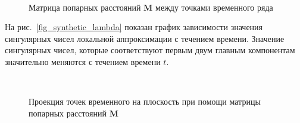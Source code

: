 \documentclass[12pt, twoside]{article}
\begin{document}
\begin{figure}[h!t]\center
{}
\\
\caption{Матрица попарных расстояний $\textbf{M}$ между точками временного ряда}
\label{fig_synthetic_distance}
\end{figure}

На рис.~\ref{fig_synthetic_lambda} показан график зависимости значения сингулярных чисел локальной аппроксимации с течением времени. Значение сингулярных чисел, которые соответствуют первым двум главным компонентам значительно меняются с течением времени $t$. 

\begin{figure}[h!t]\center
{}
\\
\caption{Проекция точек временного на плоскость при помощи матрицы попарных расстояний $\textbf{M}$}
\label{fig_synthetic_2D}
\end{figure}
\end{document}
